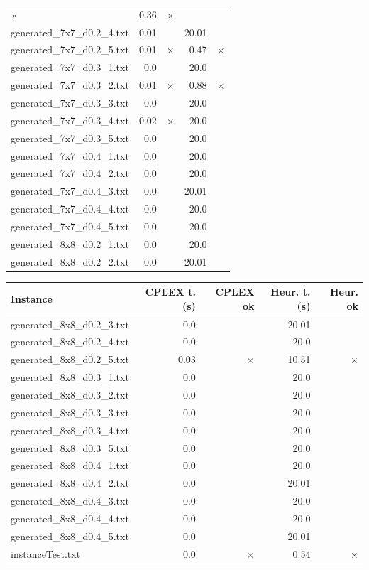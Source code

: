 \begin{center}
\begin{tabular}{lrrrr}
$\times$
 & 0.36 & 
$\times$
\\
generated\_7x7\_d0.2\_4.txt & 0.01 & 
 & 20.01 & 
\\
generated\_7x7\_d0.2\_5.txt & 0.01 & 
$\times$
 & 0.47 & 
$\times$
\\
generated\_7x7\_d0.3\_1.txt & 0.0 & 
 & 20.0 & 
\\
generated\_7x7\_d0.3\_2.txt & 0.01 & 
$\times$
 & 0.88 & 
$\times$
\\
generated\_7x7\_d0.3\_3.txt & 0.0 & 
 & 20.0 & 
\\
generated\_7x7\_d0.3\_4.txt & 0.02 & 
$\times$
 & 20.0 & 
\\
generated\_7x7\_d0.3\_5.txt & 0.0 & 
 & 20.0 & 
\\
generated\_7x7\_d0.4\_1.txt & 0.0 & 
 & 20.0 & 
\\
generated\_7x7\_d0.4\_2.txt & 0.0 & 
 & 20.0 & 
\\
generated\_7x7\_d0.4\_3.txt & 0.0 & 
 & 20.01 & 
\\
generated\_7x7\_d0.4\_4.txt & 0.0 & 
 & 20.0 & 
\\
generated\_7x7\_d0.4\_5.txt & 0.0 & 
 & 20.0 & 
\\
generated\_8x8\_d0.2\_1.txt & 0.0 & 
 & 20.0 & 
\\
generated\_8x8\_d0.2\_2.txt & 0.0 & 
 & 20.01 & 
\\
\hline\end{tabular}
\end{center}

\newpage
\begin{center}
\scriptsize
\renewcommand{\arraystretch}{1.05}
\begin{tabular}{lrrrr}
\hline
\textbf{Instance} & \textbf{CPLEX t. (s)} & \textbf{CPLEX ok} & \textbf{Heur. t. (s)} & \textbf{Heur. ok} \\
\hline
generated\_8x8\_d0.2\_3.txt & 0.0 & 
 & 20.01 & 
\\
generated\_8x8\_d0.2\_4.txt & 0.0 & 
 & 20.0 & 
\\
generated\_8x8\_d0.2\_5.txt & 0.03 & 
$\times$
 & 10.51 & 
$\times$
\\
generated\_8x8\_d0.3\_1.txt & 0.0 & 
 & 20.0 & 
\\
generated\_8x8\_d0.3\_2.txt & 0.0 & 
 & 20.0 & 
\\
generated\_8x8\_d0.3\_3.txt & 0.0 & 
 & 20.0 & 
\\
generated\_8x8\_d0.3\_4.txt & 0.0 & 
 & 20.0 & 
\\
generated\_8x8\_d0.3\_5.txt & 0.0 & 
 & 20.0 & 
\\
generated\_8x8\_d0.4\_1.txt & 0.0 & 
 & 20.0 & 
\\
generated\_8x8\_d0.4\_2.txt & 0.0 & 
 & 20.01 & 
\\
generated\_8x8\_d0.4\_3.txt & 0.0 & 
 & 20.0 & 
\\
generated\_8x8\_d0.4\_4.txt & 0.0 & 
 & 20.0 & 
\\
generated\_8x8\_d0.4\_5.txt & 0.0 & 
 & 20.01 & 
\\
instanceTest.txt & 0.0 & 
$\times$
 & 0.54 & 
$\times$
\\
\hline
\end{tabular}
\end{center}

